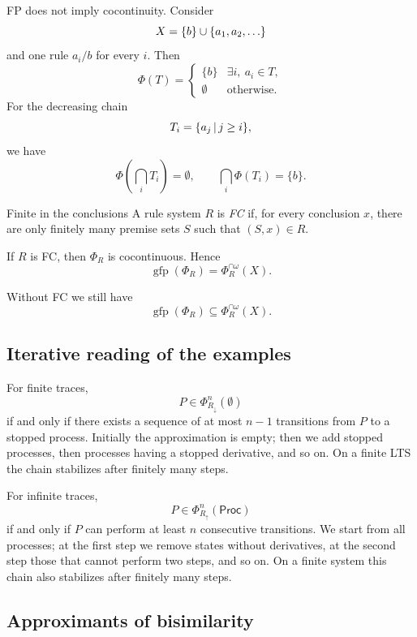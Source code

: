 \documentclass[a4paper]{article}
\newcommand{\Proc}{\mathsf{Proc}}
\newcommand{\gfp}{\operatorname{gfp}}
\begin{document}
FP does not imply cocontinuity.
Consider
\[
    X=\{b\}\cup\{a_1,a_2,\ldots\}
\]
and one rule \(a_i/b\) for every \(i\).
Then
\[
    \Phi(T)=
    \begin{cases}
        \{b\} & \exists i,\ a_i\in T,\\
        \emptyset & \text{otherwise}.
    \end{cases}
\]
For the decreasing chain
\[
    T_i=\{a_j\,|\, j\geq i\},
\]
we have
\[
    \Phi\left(\bigcap_iT_i\right)=\emptyset,
    \qquad
    \bigcap_i\Phi(T_i)=\{b\}.
\]

\begin{snippetdefinition}{Finite in the conclusions}
    A rule system \(R\) is \emph{FC} if, for every conclusion \(x\), there are only finitely many premise sets \(S\) such that \((S,x)\in R\).
\end{snippetdefinition}

\begin{snippettheorem}{}
    If \(R\) is FC, then \(\Phi_R\) is cocontinuous. Hence
    \[
        \gfp(\Phi_R)
        =
        \Phi_R^{\cap\omega}(X).
    \]
\end{snippettheorem}

Without FC we still have
\[
    \gfp(\Phi_R)
    \subseteq
    \Phi_R^{\cap\omega}(X).
\]

\subsection{Iterative reading of the examples}

For finite traces,
\[
    P\in\Phi_{R_\downarrow}^n(\emptyset)
\]
if and only if there exists a sequence of at most \(n-1\) transitions from \(P\) to a stopped process.
Initially the approximation is empty; then we add stopped processes, then processes having a stopped derivative, and so on.
On a finite LTS the chain stabilizes after finitely many steps.

For infinite traces,
\[
    P\in\Phi_{R_\uparrow}^n(\Proc)
\]
if and only if \(P\) can perform at least \(n\) consecutive transitions.
We start from all processes; at the first step we remove states without derivatives, at the second step those that cannot perform two steps, and so on.
On a finite system this chain also stabilizes after finitely many steps.

\subsection{Approximants of bisimilarity}
\end{document}
